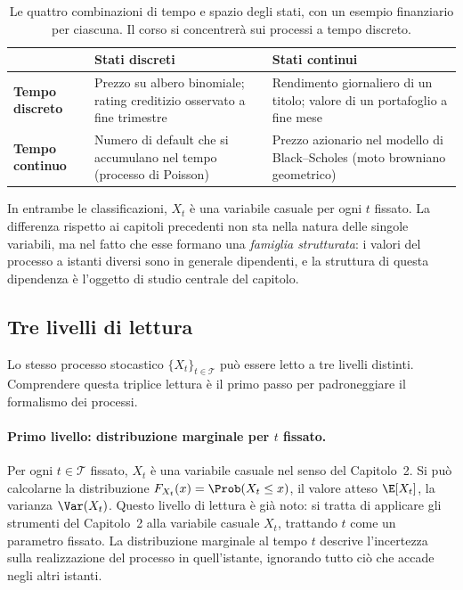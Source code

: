 \begin{table}[h]
\centering
\begin{tabular}{|p{3.0cm}|p{5.0cm}|p{5.0cm}|}
\hline
 & \textbf{Stati discreti} & \textbf{Stati continui}\\
\hline
\textbf{Tempo discreto} &
Prezzo su albero binomiale; rating creditizio osservato a fine
trimestre &
Rendimento giornaliero di un titolo; valore di un portafoglio a fine
mese\\
\hline
\textbf{Tempo continuo} &
Numero di default che si accumulano nel tempo (processo di Poisson) &
Prezzo azionario nel modello di Black--Scholes (moto browniano
geometrico)\\
\hline
\end{tabular}
\caption{Le quattro combinazioni di tempo e spazio degli stati, con
un esempio finanziario per ciascuna. Il corso si concentrer\`{a} sui
processi a tempo discreto.}
\label{tab:classi-processi}
\end{table}

In entrambe le classificazioni, $X_t$ \`{e} una variabile casuale per
ogni $t$ fissato. La differenza rispetto ai capitoli precedenti non
sta nella natura delle singole variabili, ma nel fatto che esse
formano una \emph{famiglia strutturata}: i valori del processo a
istanti diversi sono in generale dipendenti, e la struttura di questa
dipendenza \`{e} l'oggetto di studio centrale del capitolo.

\subsection{Tre livelli di lettura}

Lo stesso processo stocastico $\{X_t\}_{t\in\mathcal{T}}$ pu\`{o}
essere letto a tre livelli distinti. Comprendere questa triplice
lettura \`{e} il primo passo per padroneggiare il formalismo dei
processi.

\paragraph{Primo livello: distribuzione marginale per $t$ fissato.}
Per ogni $t\in\mathcal{T}$ fissato, $X_t$ \`{e} una variabile casuale
nel senso del Capitolo~2. Si pu\`{o} calcolarne la distribuzione
$F_{X_t}(x)=\Prob(X_t\leq x)$, il valore atteso $\E[X_t]$, la varianza
$\Var(X_t)$. Questo livello di lettura \`{e} gi\`{a} noto: si tratta
di applicare gli strumenti del Capitolo~2 alla variabile casuale
$X_t$, trattando $t$ come un parametro fissato. La distribuzione
marginale al tempo $t$ descrive l'incertezza sulla realizzazione del
processo in quell'istante, ignorando tutto ci\`{o} che accade negli
altri istanti.

